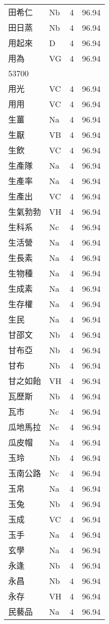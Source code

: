 \documentclass[twocolumn]{book}
\begin{document}
\begin{supertabular}{llrr}
田希仁 & Nb & 4 &  96.94\\
田日蒸 & Nb & 4 &  96.94\\
用起來 & D & 4 &  96.94\\
用為 & VG & 4 &  96.94\\
53700\\
用光 & VC & 4 &  96.94\\
用用 & VC & 4 &  96.94\\
生薑 & Na & 4 &  96.94\\
生厭 & VB & 4 &  96.94\\
生飲 & VC & 4 &  96.94\\
生產隊 & Na & 4 &  96.94\\
生產率 & Na & 4 &  96.94\\
生產出 & VC & 4 &  96.94\\
生氣勃勃 & VH & 4 &  96.94\\
生科系 & Nc & 4 &  96.94\\
生活營 & Na & 4 &  96.94\\
生長素 & Na & 4 &  96.94\\
生物種 & Na & 4 &  96.94\\
生成素 & Na & 4 &  96.94\\
生存權 & Na & 4 &  96.94\\
生民 & Na & 4 &  96.94\\
甘邵文 & Nb & 4 &  96.94\\
甘布亞 & Nb & 4 &  96.94\\
甘布 & Nb & 4 &  96.94\\
甘之如飴 & VH & 4 &  96.94\\
瓦歷斯 & Nb & 4 &  96.94\\
瓦市 & Nc & 4 &  96.94\\
瓜地馬拉 & Nc & 4 &  96.94\\
瓜皮帽 & Na & 4 &  96.94\\
玉玲 & Nb & 4 &  96.94\\
玉南公路 & Nc & 4 &  96.94\\
玉帛 & Na & 4 &  96.94\\
玉兔 & Nb & 4 &  96.94\\
玉成 & VC & 4 &  96.94\\
玉手 & Na & 4 &  96.94\\
玄學 & Na & 4 &  96.94\\
永逢 & Nb & 4 &  96.94\\
永昌 & Nb & 4 &  96.94\\
永存 & VH & 4 &  96.94\\
民藝品 & Na & 4 &  96.94\\

\end{supertabular}
\end{document}
